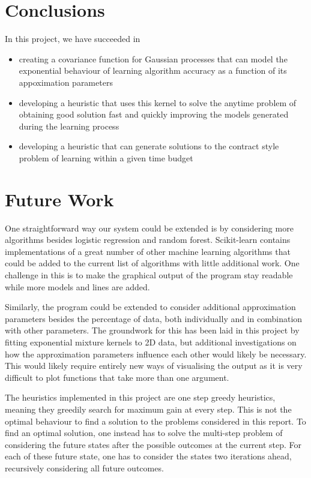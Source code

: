 \documentclass[a4paper,12pt,twoside,openright]{report}
\begin{document}
\section{Conclusions}
In this project, we have succeeded in
\begin{itemize}
	\item creating a covariance function for Gaussian processes that can model the exponential behaviour of learning algorithm accuracy as a function of its appoximation parameters
	\item developing a heuristic that uses this kernel to solve the anytime problem of obtaining good solution fast and quickly improving the models generated during the learning process
	\item developing a heuristic that can generate solutions to the contract style problem of learning within a given time budget
\end{itemize}





\section{Future Work}
One straightforward way our system could be extended is by considering more algorithms besides logistic regression and random forest. Scikit-learn contains implementations of a great number of other machine learning algorithms that could be added to the current list of algorithms with little additional work. One challenge in this is to make the graphical output of the program stay readable while more models and lines are added.

Similarly, the program could be extended to consider additional approximation parameters besides the percentage of data, both individually and in combination with other parameters. The groundwork for this has been laid in this project by fitting exponential mixture kernels to 2D data, but additional investigations on how the approximation parameters influence each other would likely be necessary. This would likely require entirely new ways of visualising the output as it is very difficult to plot functions that take more than one argument.

The heuristics implemented in this project are one step greedy heuristics, meaning they greedily search for maximum gain at every step. This is not the optimal behaviour to find a solution to the problems considered in this report. To find an optimal solution, one instead has to solve the multi-step problem of considering the future states after the possible outcomes at the current step. For each of these future state, one has to consider the states two iterations ahead, recursively considering all future outcomes.
\end{document}

